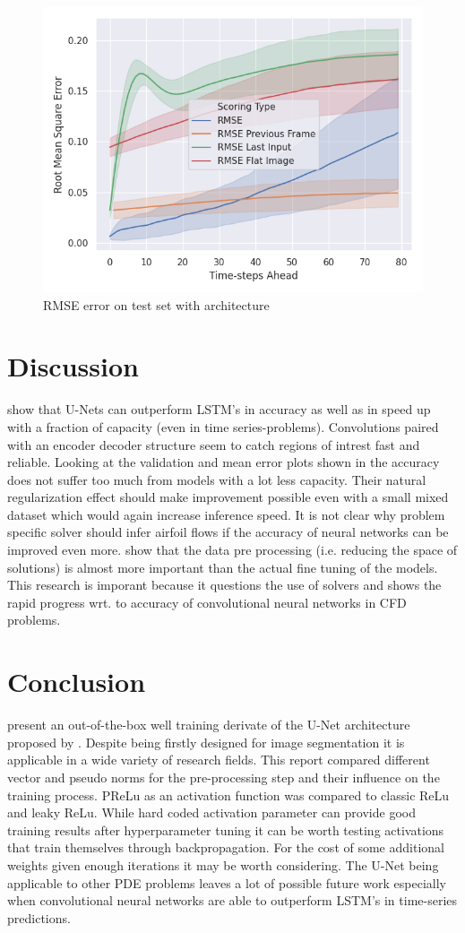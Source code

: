 \documentclass[acmtog]{techreportacmart}
\begin{document}
\begin{figure}[H]
  \includegraphics[width=.4\textwidth]{figures/transfer/Transfer_Test_RMSE_Quality_start_15}
  \caption{RMSE error on test set with \cite{Fotiadis2020} architecture}
  \label{fig:T2}
\end{figure}


\section{Discussion}
\cite{Fotiadis2020} show that U-Nets can outperform LSTM's in accuracy as well as in speed up with a fraction of capacity (even in time series-problems). Convolutions paired with an encoder decoder structure seem to catch regions of intrest fast and reliable. Looking at the validation and mean error plots shown in \cite{Thuerey20} the accuracy does not suffer too much from models with a lot less capacity. Their natural regularization effect should make improvement possible even with a small mixed dataset which would again increase inference speed. It is not clear why problem specific solver should infer airfoil flows if the accuracy of neural networks can be improved even more. \cite{Thuerey20} show that the data pre processing (i.e. reducing the space of solutions) is almost more important than the actual fine tuning of the models. This research is imporant because it questions the use of solvers and shows the rapid progress wrt. to accuracy of convolutional neural networks in CFD problems.

\section{Conclusion} 
\cite{Thuerey20} present an out-of-the-box well training derivate of the U-Net architecture proposed by \cite{ronneberger2015}. Despite being firstly designed for image segmentation it is applicable in a wide variety of research fields. This report compared different vector and pseudo norms for the pre-processing step and their influence on the training process. PReLu as an activation function was compared to classic ReLu and leaky ReLu. While hard coded activation parameter can provide good training results after hyperparameter tuning it can be worth testing activations that train themselves through backpropagation. For the cost of some additional weights given enough iterations it may be worth considering. The U-Net being applicable to other PDE problems leaves a lot of possible future work especially when convolutional neural networks are able to outperform LSTM's in time-series predictions.\\
\end{document}
